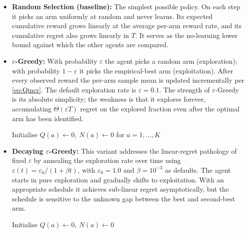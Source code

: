 \begin{itemize}
\item \textbf{Random Selection (baseline):}
The simplest possible policy. On each step it picks an arm uniformly at random and never learns. Its expected cumulative reward grows linearly at the average per-arm reward rate, and its cumulative regret also grows linearly in $T$. It serves as the no-learning lower bound against which the other agents are compared.
\begin{algorithm}[H]
\caption{Random Selection}
\end{algorithm}

\item \textbf{$\varepsilon$-Greedy:}
With probability $\varepsilon$ the agent picks a random arm (exploration); with probability $1-\varepsilon$ it picks the empirical-best arm (exploitation). After every observed reward the per-arm sample mean is updated incrementally per \cref{eq:Qincr}. The default exploration rate is $\varepsilon = 0.1$. The strength of $\varepsilon$-Greedy is its absolute simplicity; the weakness is that it explores forever, accumulating $\Theta(\varepsilon T)$ regret on the explored fraction even after the optimal arm has been identified.
\begin{algorithm}[H]
Initialise $Q(a) \leftarrow 0,\ N(a) \leftarrow 0$ for $a=1,\ldots,K$\;
\caption{$\varepsilon$-Greedy}
\end{algorithm}

\item \textbf{Decaying $\varepsilon$-Greedy:}
This variant addresses the linear-regret pathology of fixed $\varepsilon$ by annealing the exploration rate over time using $\varepsilon(t) = \varepsilon_0 / (1 + \beta t)$, with $\varepsilon_0 = 1.0$ and $\beta = 10^{-3}$ as defaults. The agent starts in pure exploration and gradually shifts to exploitation. With an appropriate schedule it achieves sub-linear regret asymptotically, but the schedule is sensitive to the unknown gap between the best and second-best arm.
\begin{algorithm}[H]
Initialise $Q(a) \leftarrow 0,\ N(a) \leftarrow 0$\;
\caption{Decaying $\varepsilon$-Greedy}
\end{algorithm}


\end{itemize}
